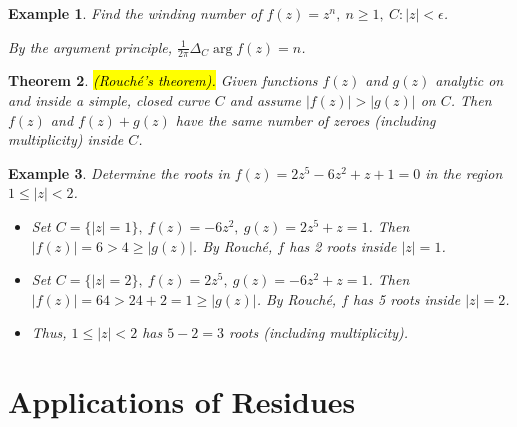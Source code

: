 \documentclass{article}
\newtheorem{theorem}{Theorem}[section]
\newtheorem{example}[theorem]{Example}
\theoremstyle{definition}
\begin{document}
\begin{example} \normalfont
    Find the winding number of $f(z) = z^n,\ n \geq 1,\ C: |z| < \epsilon$.

    By the argument principle, $\frac{1}{2\pi} \Delta_C \arg f(z) = n$.
\end{example}

\begin{theorem} \normalfont
    \hl{(Rouch\'e's theorem).} Given functions $f(z)$ and $g(z)$ analytic on and inside a simple, closed curve $C$ and assume $|f(z)| > |g(z)|$ on $C$. Then $f(z)$ and $f(z) + g(z)$ have the same number of zeroes (including multiplicity) inside $C$.
\end{theorem}

\begin{example} \normalfont
    Determine the roots in $f(z) = 2z^5 - 6z^2 + z + 1 = 0$ in the region $1 \leq |z| < 2$.
    \begin{itemize}
        \item Set $C = \{ |z| = 1 \},\ f(z) = -6z^2,\ g(z) = 2z^5 + z = 1$. Then $|f(z)| = 6 > 4 \geq |g(z)|$. By Rouch\'e, $f$ has 2 roots inside $|z|=1$.
        \item Set $C = \{ |z| = 2 \},\ f(z) = 2z^5,\ g(z) = -6z^2 + z = 1$. Then $|f(z)| = 64 > 24+2=1 \geq |g(z)|$. By Rouch\'e, $f$ has 5 roots inside $|z|=2$.
        \item Thus, $1 \leq |z| < 2$ has $5-2=3$ roots (including multiplicity).
    \end{itemize}
\end{example}


\section{Applications of Residues}
\end{document}
